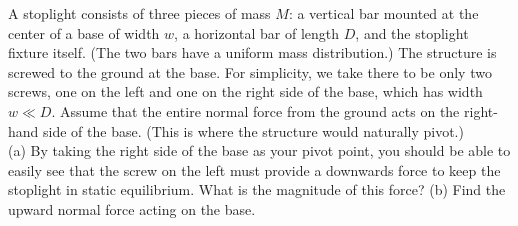 A stoplight consists of three pieces of mass $M$: a vertical bar
mounted at the center of a base of width $w$, a horizontal bar of
length $D$, and the stoplight fixture itself. (The two bars have a
uniform mass distribution.) The structure is screwed to the ground at the
base. For simplicity, we take there to be only two screws, one
on the left and one on the right side of the base, which has width $w \ll D$.
Assume that the entire normal force from the ground acts on the
right-hand side of the base. (This is where the structure would
naturally pivot.)\\
%
(a) By taking the right side of the base as your pivot point, you
should be able to easily see that the screw on the left must provide
a downwards force to keep the stoplight in static equilibrium. What
is the magnitude of this force?\answercheck\hwendpart
%
(b) Find the upward normal force acting on the base.\answercheck
